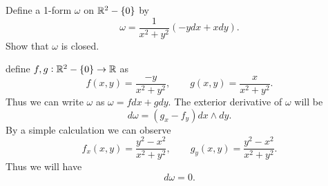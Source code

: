 \begin{problem}
	Define a 1-form $ \omega $ on $ \mathbb{R}^2 - \{0\} $ by
	\[ \omega = \frac{1}{x^2+y^2}(-ydx + xdy). \]
	Show that $ \omega $ is closed.
\end{problem}
\begin{solution}
	define $ f,g: \mathbb{R}^2-\{0\} \to \mathbb{R} $ as 
	\[ f(x,y) = \frac{-y}{x^2 + y^2}, \qquad g(x,y) = \frac{x}{x^2 + y^2}. \]
	Thus we can write $ \omega $ as $ \omega = f dx + g dy $. The exterior derivative of $ \omega $ will be
	\[ d\omega = (g_x - f_y) dx \wedge dy. \]
	By a simple calculation we can observe
	\[ f_x(x,y) = \frac{y^2 - x^2}{x^2 + y^2}, \qquad g_y(x,y) = \frac{y^2 - x^2 }{x^2 + y^2}. \]
	Thus we will have
	\[ d\omega = 0. \]
\end{solution}
